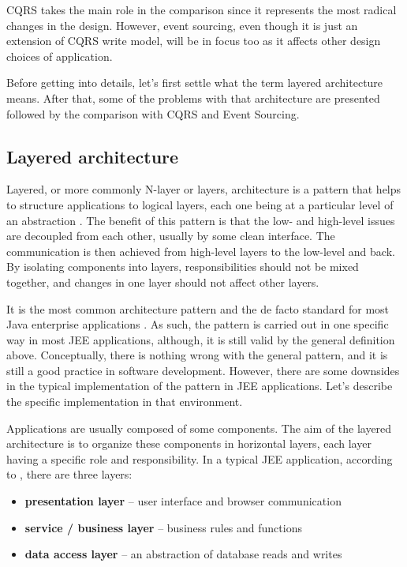 \documentclass{book}
\begin{document}
CQRS takes the main role in the comparison since it represents the most
radical changes in the design. However, event sourcing, even though it
is just an extension of CQRS write model, will be in focus too as it
affects other design choices of application.

Before getting into details, let's first settle what the term layered
architecture means. After that, some of the problems with that
architecture are presented followed by the comparison with CQRS and
Event Sourcing.

\subsection{Layered architecture}\label{layered-architecture}

Layered, or more commonly N-layer or layers, architecture is a pattern
that helps to structure applications to logical layers, each one being
at a particular level of an abstraction \cite{pattern-oriented}. The
benefit of this pattern is that the low- and high-level issues are
decoupled from each other, usually by some clean interface. The
communication is then achieved from high-level layers to the low-level
and back. By isolating components into layers, responsibilities should
not be mixed together, and changes in one layer should not affect other
layers.

It is the most common architecture pattern and the de facto standard for
most Java enterprise applications \cite{oreilly}. As such, the pattern
is carried out in one specific way in most JEE applications, although,
it is still valid by the general definition above. Conceptually, there
is nothing wrong with the general pattern, and it is still a good
practice in software development. However, there are some downsides in
the typical implementation of the pattern in JEE applications. Let's
describe the specific implementation in that environment.

Applications are usually composed of some components. The aim of the
layered architecture is to organize these components in horizontal
layers, each layer having a specific role and responsibility. In a
typical JEE application, according to \cite{javadocs}, there are three
layers:

\begin{itemize}
\tightlist
\item
  \textbf{presentation layer} -- user interface and browser
  communication
\item
  \textbf{service / business layer} -- business rules and functions
\item
  \textbf{data access layer} -- an abstraction of database reads and
  writes
\end{itemize}
\end{document}
